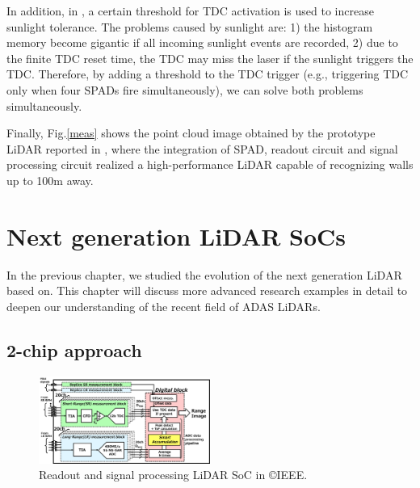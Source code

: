 \documentclass[paper]{ieice}
\begin{document}
In addition, in \cite{niclass20130}, a certain threshold for TDC activation is used to increase sunlight tolerance.
The problems caused by sunlight are: 1) the histogram memory become gigantic if all incoming sunlight events are recorded, 2) due to the finite TDC reset time, the TDC may miss the laser if the sunlight triggers the TDC. Therefore, by adding a threshold to the TDC trigger (e.g., triggering TDC only when four SPADs fire simultaneously), we can solve both problems simultaneously.

Finally, Fig.\ref{meas} shows the point cloud image obtained by the prototype LiDAR reported in \cite{niclass20130}, where the integration of SPAD, readout circuit and signal processing circuit realized a high-performance LiDAR capable of recognizing walls up to 100m away.


\section{Next generation LiDAR SoCs}
\qquad In the previous chapter, we studied the evolution of the next generation LiDAR based on\cite{niclass20130}. This chapter will discuss more advanced research examples in detail to deepen our understanding of the recent field of ADAS LiDARs.

\subsection{2-chip approach}
\begin{figure}[!t]
\centering
 \includegraphics[width=0.5\textwidth]{figs/toshibasoc.png}
  \caption{Readout and signal processing LiDAR SoC in \cite{yoshioka201820} \copyright IEEE.}
\label{rxchip}
\end{figure}
\end{document}
